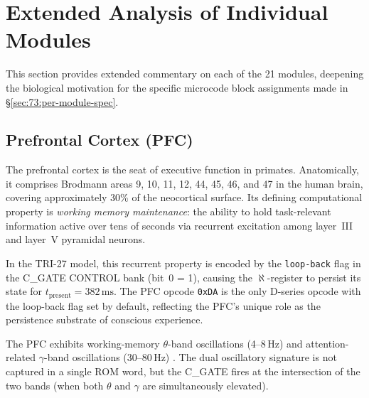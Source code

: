 
\section{Extended Analysis of Individual Modules}
\label{sec:73:extended}

This section provides extended commentary on each of the 21
modules, deepening the biological motivation for the specific
microcode block assignments made in §\ref{sec:73:per-module-spec}.

\subsection{Prefrontal Cortex (PFC)}
\label{sec:73:ext-pfc}

The prefrontal cortex is the seat of executive function in primates.
Anatomically, it comprises Brodmann areas 9, 10, 11, 12, 44, 45,
46, and 47 in the human brain, covering approximately
30\% of the neocortical surface.
Its defining computational property is \emph{working memory
maintenance}: the ability to hold task-relevant information active
over tens of seconds via recurrent excitation among layer~III and
layer~V pyramidal neurons.

In the TRI-27 model, this recurrent property is encoded by the
\texttt{loop-back} flag in the C\_GATE CONTROL bank (bit~0 = 1),
causing the $\aleph$-register to persist its state for
$t_{\mathrm{present}} = 382\,\mathrm{ms}$.
The PFC opcode \texttt{0xDA} is the only D-series opcode with the
loop-back flag set by default, reflecting the PFC's unique role as
the persistence substrate of conscious experience.

The PFC exhibits working-memory $\theta$-band oscillations (4--8\,Hz)
and attention-related $\gamma$-band oscillations (30--80\,Hz)
\cite{buzsaki2006rhythms}.
The dual oscillatory signature is not captured in a single ROM word,
but the C\_GATE fires at the intersection of the two bands
(when both $\theta$ and $\gamma$ are simultaneously elevated).

